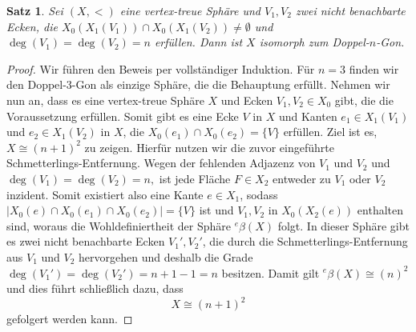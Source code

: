 \documentclass[12pt,titlepage,twoside,cleardoublepage]{article}
\theoremstyle{nummermitklammern}
\newtheorem{satz}[temp]{Satz}
\newtheorem{satz}[zahl]{Satz}
\numberwithin{equation}{section}
\begin{document}
\begin{satz}\label{ngon}
Sei $(X,<)$ eine vertex-treue Sphäre und $V_1,V_2$ zwei nicht benachbarte Ecken, die  $X_0(X_1(V_1))\cap X_0(X_1(V_2))\neq \emptyset$ und $\deg(V_1)=\deg(V_2)= n$ erfüllen. Dann ist $X$ isomorph zum Doppel-$n$-Gon.
\end{satz}
\begin{proof}
Wir  führen den Beweis per vollständiger Induktion. Für $n=3$ finden wir den Doppel-3-Gon als einzige Sphäre, die die Behauptung erfüllt. Nehmen wir nun an, dass es eine vertex-treue Sphäre $X$ und Ecken $V_1,V_2\in X_0$ gibt, die die Voraussetzung erfüllen. Somit gibt es eine Ecke $V$ in $X$ und Kanten $e_1\in X_1(V_1)$ und $e_2 \in X_1(V_2)$ in $X$, die $X_0(e_1)\cap X_0(e_2)=\{V\}$ erfüllen.
 Ziel ist es, $X\cong (n+1)^2$ zu zeigen. Hierfür nutzen wir die zuvor eingeführte Schmetterlings-Entfernung. Wegen der fehlenden Adjazenz von $V_1$ und $V_2$ und $\deg(V_1)=\deg(V_2)= n,$ ist jede Fläche $F\in X_2$ entweder zu $V_1$ oder $V_2$ inzident. Somit existiert also eine Kante $e\in X_1$, sodass $\vert X_0(e)\cap X_0(e_1)\cap X_0(e_2)\vert  =\{V\}$
 ist und $V_1,V_2$ in $X_0(X_2(e))$ enthalten sind, woraus die Wohldefiniertheit der Sphäre ${{}^e\beta(X)}$ folgt. In dieser Sphäre gibt es zwei nicht benachbarte Ecken $V_1',V_2'$, die durch die Schmetterlings-Entfernung aus $V_1$ und $V_2$ hervorgehen und deshalb die Grade $\deg(V_1')=\deg(V_2')=n+1-1=n$ besitzen. Damit gilt ${{}^e\beta(X)}\cong (n)^2$ und dies führt schließlich dazu, dass 
 \[
X\cong (n+1)^2 
 \]
 gefolgert werden kann.
\end{proof}
\end{document}
